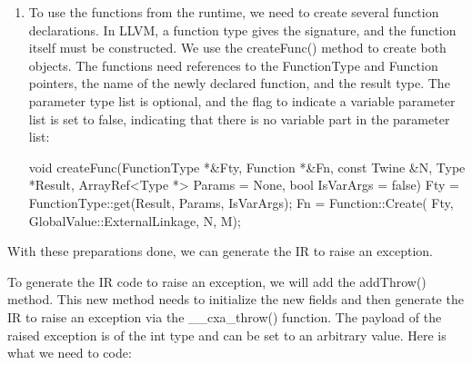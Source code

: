 \begin{enumerate}
\item
To use the functions from the runtime, we need to create several function declarations. In LLVM, a function type gives the signature, and the function itself must be constructed. We use the createFunc() method to create both objects. The functions need references to the FunctionType and Function pointers, the name of the newly declared function, and the result type. The parameter type list is optional, and the flag to indicate a variable parameter list is set to false, indicating that there is no variable part in the parameter list:

\begin{cpp}
void createFunc(FunctionType *&Fty, Function *&Fn,
                const Twine &N, Type *Result,
                ArrayRef<Type *> Params = None,
                bool IsVarArgs = false) {
    Fty = FunctionType::get(Result, Params, IsVarArgs);
    Fn = Function::Create(
        Fty, GlobalValue::ExternalLinkage, N, M);
}
\end{cpp}
\end{enumerate}

With these preparations done, we can generate the IR to raise an exception.


To generate the IR code to raise an exception, we will add the addThrow() method. This new method needs to initialize the new fields and then generate the IR to raise an exception via the \_\_cxa\_throw() function. The payload of the raised exception is of the int type and can be set to an arbitrary value. Here is what we need to code:


